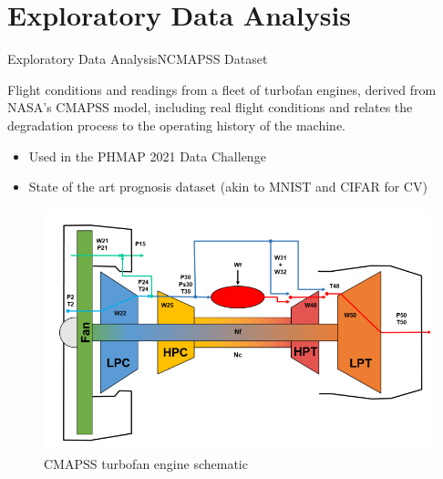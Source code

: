 \documentclass{beamer}
\begin{document}
    \section{Exploratory Data Analysis}

        \begin{frame}{Exploratory Data Analysis}{NCMAPSS Dataset}

            Flight conditions and readings from a fleet of turbofan engines,
            derived from NASA's CMAPSS model, including real flight conditions and relates the degradation process to the operating history of the machine. \cite{arias2021aircraft}
            \begin{itemize}
                \item Used in the PHMAP 2021 Data Challenge \cite{phm-conference}
                \item State of the art prognosis dataset (akin to MNIST and CIFAR for CV)
            \end{itemize}

            \begin{figure}[!htbp]
                \centering
                \includegraphics[scale=0.35]{cmapss_turbofan.png}
                \caption{CMAPSS turbofan engine schematic}
            \end{figure}
        \end{frame}
\end{document}
